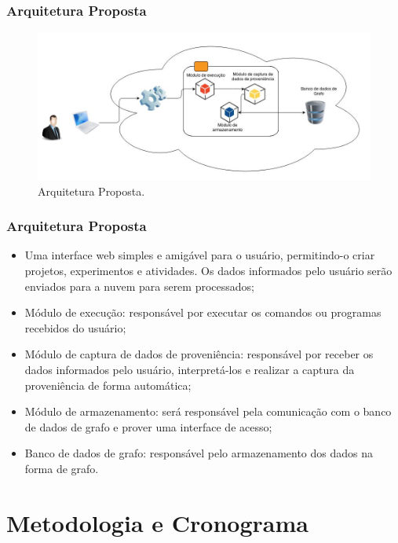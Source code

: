 \documentclass{beamer}
\begin{document}
\begin{frame}
\frametitle{Arquitetura Proposta}
\begin{figure}[h!]
\centering
\includegraphics[width=350pt]{images/ArquiteturaPropostaII.jpg}
\caption{Arquitetura Proposta.}
\label{fig:arquitetura}
\end{figure}
\end{frame}


\begin{frame}
\frametitle{Arquitetura Proposta}
\begin{itemize}
\item Uma interface web simples e amig\'avel para o usu\'ario,
  permitindo-o criar projetos, experimentos e atividades. Os dados
  informados pelo usu\'ario ser\~ao enviados para a nuvem para serem
  processados;
\item M\'odulo de execu\c{c}\~ao: respons\'avel por executar os
  comandos ou programas recebidos do usu\'ario;
\item M\'odulo de captura de dados de proveni\^encia: respons\'avel
  por receber os dados informados pelo usu\'ario, interpret\'a-los e
  realizar a captura da proveni\^encia de forma autom\'atica;
\item M\'odulo de armazenamento: ser\'a respons\'avel pela
  comunica\c{c}\~ao com o banco de dados de grafo e prover uma
  interface de acesso;
\item Banco de dados de grafo: respons\'avel pelo armazenamento dos
  dados na forma de grafo.
\end{itemize}
\end{frame}

\section{Metodologia e Cronograma}
\end{document}
